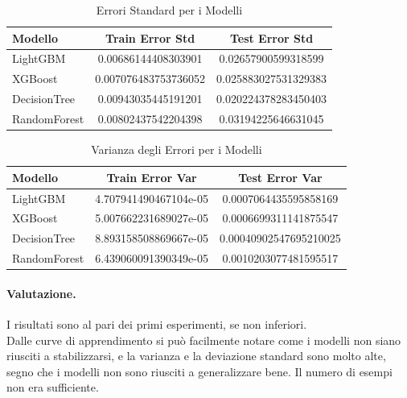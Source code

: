 \begin{table}[H]
    \centering
    \begin{tabular}{lcc}
    \toprule
    \textbf{Modello} & \textbf{Train Error Std} & \textbf{Test Error Std} \\
    \midrule
    LightGBM & 0.00686144408303901 & 0.02657900599318599 \\
    XGBoost & 0.007076483753736052 & 0.025883027531329383 \\
    DecisionTree & 0.00943035445191201 & 0.020224378283450403 \\
    RandomForest & 0.00802437542204398 & 0.03194225646631045 \\
    \bottomrule
    \end{tabular}
    \caption{Errori Standard per i Modelli}
    
\end{table}

\begin{table}[H]
    \centering
    \begin{tabular}{lcc}
    \toprule
    \textbf{Modello} & \textbf{Train Error Var} & \textbf{Test Error Var} \\
    \midrule
    LightGBM & 4.707941490467104e-05 & 0.0007064435595858169 \\
    XGBoost & 5.007662231689027e-05 & 0.0006699311141875547\\
    DecisionTree & 8.893158508869667e-05 & 0.00040902547695210025 \\
    RandomForest & 6.439060091390349e-05 & 0.0010203077481595517\\
    \bottomrule
    \end{tabular}
    \caption{Varianza degli Errori per i Modelli}
    
\end{table}

\paragraph{Valutazione.} I risultati sono al pari dei primi esperimenti, se non inferiori. \\ Dalle curve di apprendimento si può facilmente notare come i modelli non siano riusciti a stabilizzarsi, e la varianza e la deviazione standard sono molto alte, segno che i modelli non sono riusciti a generalizzare bene. Il numero di esempi non era sufficiente.

